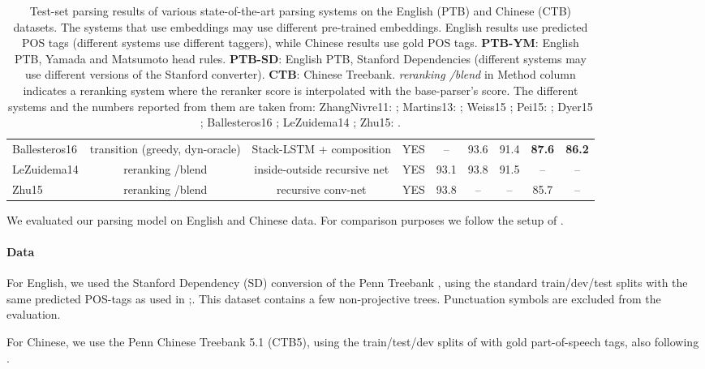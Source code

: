 \documentclass[11pt]{article}
\begin{document}
\begin{table*}[ht]
{\begin{tabular}{l|c|c|c|c|cc|cc}
Ballesteros16 & transition (greedy, dyn-oracle) & Stack-LSTM + composition & YES & -- & 93.6 & 91.4 & \textbf{87.6} & \textbf{86.2} \\
LeZuidema14 & reranking /blend & inside-outside recursive net & YES & 93.1 & 93.8 & 91.5 & -- & -- \\
Zhu15 & reranking /blend & recursive conv-net & YES & 93.8 & -- & -- & 85.7 & --\\
\end{tabular}}
\caption{\footnotesize Test-set parsing results of various state-of-the-art
parsing systems on the English (PTB) and Chinese (CTB) datasets. The systems
that use embeddings may use different pre-trained embeddings.
English results use predicted POS tags (different systems use different
taggers), while Chinese results use gold POS tags. 
\textbf{PTB-YM}: English PTB, Yamada and Matsumoto
head rules. \textbf{PTB-SD}: English PTB, Stanford Dependencies (different
systems may use different versions of the Stanford converter). \textbf{CTB}:
Chinese Treebank.  
\emph{reranking /blend} in Method column indicates a reranking system where the
reranker score is interpolated with the base-parser's score. 
The different systems and the numbers reported from them are taken from:
ZhangNivre11: \cite{zhang11acl}; Martins13: \cite{martins2013turbo}; Weiss15
\cite{weiss2015structured}; Pei15: \cite{pei2015effective}; Dyer15
\cite{dyer2015transitionbased}; Ballesteros16 \cite{ballesteros2016dynamic}; LeZuidema14
\cite{le2014insideoutside}; Zhu15: \cite{zhu2015reranking}. }
\label{tbl:sota}
\end{table*}

We evaluated our parsing model on English and Chinese data.
For comparison purposes we follow the setup of
.
\paragraph{Data}
For English, we used the Stanford Dependency (SD) \cite{sd} conversion of the Penn
Treebank \cite{penntb}, using the standard train/dev/test splits with the same predicted POS-tags as used in
;. This dataset contains a few non-projective trees.
Punctuation symbols are excluded from the evaluation.

For Chinese, we use the Penn Chinese Treebank 5.1 (CTB5), using the
train/test/dev splits of
\cite{tale-two-parsers,dyer2015transitionbased} with gold
part-of-speech tags, also following
\cite{dyer2015transitionbased,chen2014fast}.
\end{document}
